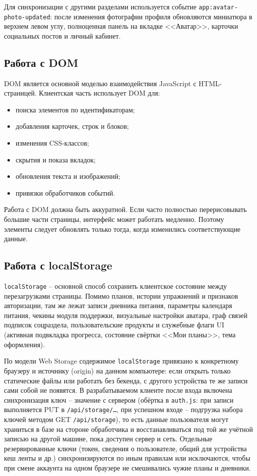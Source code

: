 Для синхронизации с другими разделами используется событие \texttt{app:avatar-photo-updated}: после изменения фотографии профиля обновляются миниатюра в верхнем левом углу, полноценная панель на вкладке <<Аватар>>, карточки социальных постов и личный кабинет.

\subsection{Работа с DOM}

DOM является основной моделью взаимодействия JavaScript с HTML-страницей. Клиентская часть использует DOM для:
\begin{itemize}
	\item поиска элементов по идентификаторам;
	\item добавления карточек, строк и блоков;
	\item изменения CSS-классов;
	\item скрытия и показа вкладок;
	\item обновления текста и изображений;
	\item привязки обработчиков событий.
\end{itemize}

Работа с DOM должна быть аккуратной. Если часто полностью перерисовывать большие части страницы, интерфейс может работать медленно. Поэтому элементы следует обновлять только тогда, когда изменились соответствующие данные.

\subsection{Работа с localStorage}

\texttt{localStorage} -- основной способ сохранить клиентское состояние между перезагрузками страницы. Помимо планов, истории упражнений и признаков авторизации, там же лежат записи дневника питания, параметры календаря питания, чекины модуля поддержки, визуальные настройки аватара, граф связей подписок соцраздела, пользовательские продукты и служебные флаги UI (активная подвкладка прогресса, состояние свёртки <<Мои планы>>, тема оформления).

По модели Web Storage содержимое \texttt{localStorage} привязано к конкретному браузеру и источнику (origin) на данном компьютере: если открыть только статические файлы или работать без бекенда, с другого устройства те же записи сами собой не появятся. В разрабатываемом клиенте после входа включена синхронизация ключ -- значение с сервером (обёртка в \texttt{auth.js}: при записи выполняется PUT в \texttt{/api/storage/\ldots}, при успешном входе -- подгрузка набора ключей методом GET \texttt{/api/storage}), то есть данные пользователя могут храниться в базе на стороне обработчика и восстанавливаться под той же учётной записью на другой машине, пока доступен сервер и сеть. Отдельные резервированные ключи (токен, сведения о пользователе, общий для устройства кеш ленты и др.) синхронизируются по иным правилам или исключаются, чтобы при смене аккаунта на одном браузере не смешивались чужие планы и дневники.

